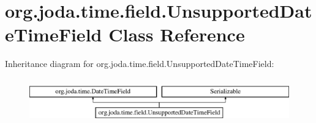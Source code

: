 \hypertarget{classorg_1_1joda_1_1time_1_1field_1_1_unsupported_date_time_field}{\section{org.\-joda.\-time.\-field.\-Unsupported\-Date\-Time\-Field Class Reference}
\label{classorg_1_1joda_1_1time_1_1field_1_1_unsupported_date_time_field}
}
Inheritance diagram for org.\-joda.\-time.\-field.\-Unsupported\-Date\-Time\-Field\-:\begin{figure}[H]
\begin{center}
\leavevmode
\includegraphics[height=2.000000cm]{classorg_1_1joda_1_1time_1_1field_1_1_unsupported_date_time_field}
\end{center}
\end{figure}
